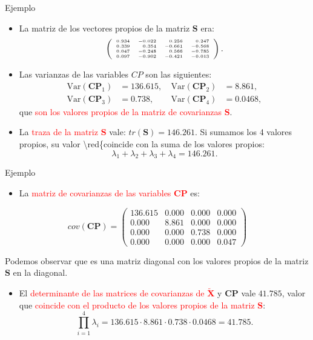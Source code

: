 \documentclass[
  ignorenonframetext,
]{beamer}
\providecommand{\tightlist}{%
  \setlength{\itemsep}{0pt}\setlength{\parskip}{0pt}}
\newcommand\red[1]{\textcolor{red}{#1}}
\begin{document}
\begin{frame}{Ejemplo}
\label{ejemplo-16}
\begin{itemize}
\item
  La matriz de los vectores propios de la matriz \(\mathbf{S}\) era: \[
  {\tiny 
  \left(
  \begin{array}{rrrr}
  0.934 & -0.022 & 0.256 & 0.247 \\
   0.339 & 0.354 & -0.661 & -0.568 \\
   0.047 & -0.248 & 0.566 & -0.785 \\
   0.097 & -0.902 & -0.421 & -0.013 
  \end{array}\right).}
  \]
\item
  Las varianzas de las variables \(CP\) son las siguientes: \[
  \begin{array}{llcll}
  \mbox{Var}(\mathbf{CP}_1) & =136.615,\ & \mbox{Var}(\mathbf{CP}_2) & =8.861,\\ 
  \mbox{Var}(\mathbf{CP}_3) & =0.738,\ &\mbox{Var}(\mathbf{CP}_4) & =0.0468,
  \end{array}
  \] que \red{son los valores propios de la matriz de
  covarianzas $\mathbf{S}$}.
\item
  La \red{traza de la matriz $\mathbf{S}$} vale:
  \(tr(\mathbf{S})=146.261\). Si sumamos los 4 valores propios, su valor
  \textbackslash red\{coincide con la suma de los valores propios:
  \[\lambda_1+\lambda_2+\lambda_3+\lambda_4 = 146.261.\]
\end{itemize}
\end{frame}

\begin{frame}{Ejemplo}
\label{ejemplo-17}
\begin{itemize}
\tightlist
\item
  La \red{matriz de covarianzas de las variables $\mathbf{CP}$} es:
\end{itemize}

\[
cov(\mathbf{CP})=
\left(
\begin{array}{rrrr}
136.615 & 0.000 & 0.000 & 0.000 \\
 0.000 & 8.861 & 0.000 & 0.000 \\
 0.000 & 0.000 & 0.738 & 0.000 \\
 0.000 & 0.000 & 0.000 & 0.047 
\end{array}
\right)
\]

Podemos observar que es una matriz diagonal con los valores propios de
la matriz \(\mathbf{S}\) en la diagonal.

\begin{itemize}
\tightlist
\item
  El
  \red{determinante de las matrices de covarianzas de $\tilde{\mathbf{X}}$}
  y \(\mathbf{CP}\) vale \(41.785\), valor que
  \red{coincide con el producto de los valores
  propios de la matriz $\mathbf{S}$}: \[
  \prod_{i=1}^4 \lambda_i= 136.615\cdot 8.861\cdot 0.738\cdot 0.0468 = 41.785.
  \]
\end{itemize}
\end{frame}
\end{document}
